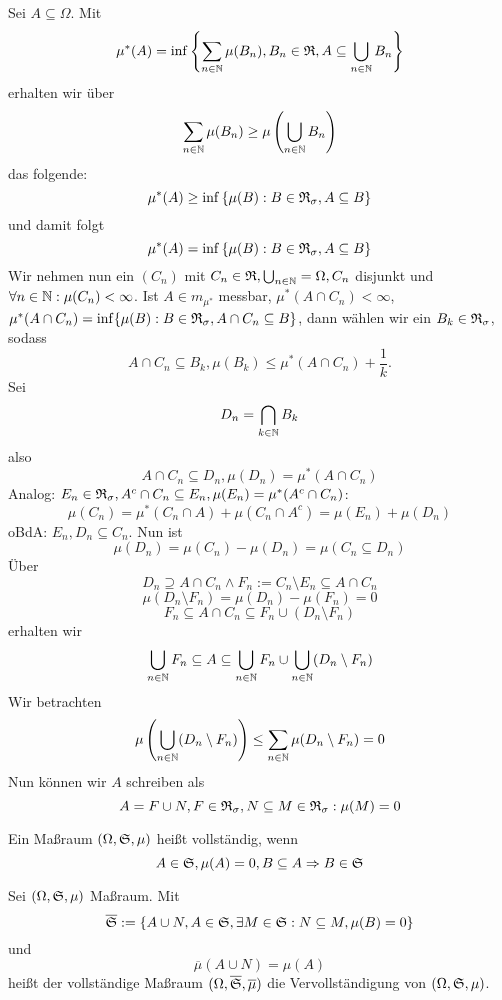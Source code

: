 			\begin{bew}
				Sei $A\subseteq \Omega$. Mit 
				\[ \mu^*(A)=\inf\left\{\sum_{n\in\mathbb{N}} \mu(B_n), B_n\in\mathfrak{R}, A\subseteq \bigcup_{n\in\mathbb{N}}B_n \right\} \]
				erhalten wir über
				\[ \sum_{n\in\mathbb{N}} \mu(B_n)\ge \mu\left(\bigcup_{n\in\mathbb{N}}B_n\right) \]
				das folgende:
				\[ \mu^*(A)\ge\inf\left\{\mu(B):B\in\mathfrak{R}_\sigma, A\subseteq B\right\} \]
				und damit folgt
				\[ \mu^*(A)=\inf\left\{\mu(B):B\in\mathfrak{R}_\sigma, A\subseteq B\right\} \]
				Wir nehmen nun ein $(C_n)$ mit $C_n\in\mathfrak{R}, \bigcup_{n\in\mathbb{N}}=\Omega, C_n$ disjunkt und $\forall n\in\mathbb{N}: \mu(C_n)<\infty$. Ist $A\in m_{\mu^*}$ messbar, $\mu^*(A\cap C_n)<\infty$, $\mu^*(A\cap C_n)=\inf\{\mu(B):B\in\mathfrak{R}_\sigma, A\cap C_n\subseteq B\}$, dann wählen wir ein $B_k\in\mathfrak{R}_\sigma$, sodass
				\[ A\cap C_n\subseteq B_k, \mu(B_k)\le \mu^*(A\cap C_n)+\frac{1}{k}. \]
				Sei 
				\[ D_n=\bigcap_{k\in\mathbb{N}} B_k\]
				also 
				\[ A\cap C_n\subseteq D_n, \mu(D_n)=\mu^*(A\cap C_n) \]
				Analog: $E_n\in\mathfrak{R}_\sigma, A^c\cap C_n\subseteq E_n, \mu(E_n)=\mu^*(A^c\cap C_n)$:
				\[ \mu(C_n)=\mu^*(C_n\cap A)+\mu(C_n\cap A^c)=\mu(E_n)+\mu(D_n) \]
				oBdA: $E_n,D_n\subseteq C_n$. Nun ist 
				\[ \mu(D_n)=\mu(C_n)-\mu(D_n)=\mu(C_n\subseteq D_n) \]
				Über
				\[ D_n\supseteq A\cap C_n \land F_n:=C_n\setminus E_n\subseteq A\cap C_n\]
				\[ \mu(D_n\setminus F_n)=\mu(D_n)-\mu(F_n)=0 \]
				\[ F_n\subseteq A\cap C_n\subseteq F_n\cup (D_n\setminus F_n) \]
				erhalten wir
				\[ \bigcup_{n\in\mathbb{N}} F_n\subseteq A\subseteq \bigcup_{n\in\mathbb{N}} F_n\cup \bigcup_{n\in\mathbb{N}}(D_n\setminus F_n) \]
				Wir betrachten
				\[ \mu\left(\bigcup_{n\in\mathbb{N}} (D_n\setminus F_n)\right)\le \sum_{n\in\mathbb{N}} \mu(D_n\setminus F_n)=0 \]
				Nun können wir $A$ schreiben als
				\[ A=F\cup N, F\in\mathfrak{R}_\sigma, N\subseteq M\in\mathfrak{R}_\sigma:\mu(M)=0 \]
			\end{bew}
			
			\begin{defi}
				Ein Maßraum $(\Omega,\mathfrak{S},\mu)$ heißt vollständig, wenn 
				\[ A\in\mathfrak{S}, \mu(A)=0, B\subseteq A\Rightarrow B\in\mathfrak{S} \]
			\end{defi}
			
			\begin{defi}
				Sei $(\Omega,\mathfrak{S}, \mu)$ Maßraum. Mit
				\[ \overline{\mathfrak{S}}:=\{A\cup N, A\in\mathfrak{S}, \exists M\in\mathfrak{S}: N\subseteq M, \mu(B)=0 \} \]
				und
				\[ \overline{\mu}(A\cup N)=\mu(A) \]
				heißt der vollständige Maßraum $(\Omega, \overline{\mathfrak{S}}, \overline{\mu})$ die Vervollständigung von $(\Omega, \mathfrak{S}, \mu)$.
			\end{defi}
			
			